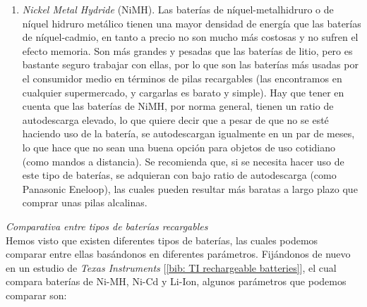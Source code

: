 \documentclass[12pt]{article}
\begin{document}
\begin{enumerate}
		\item \textit{Nickel Metal Hydride} (NiMH). Las baterías de níquel-metalhidruro o de níquel hidruro metálico tienen una mayor densidad de energía que las baterías de níquel-cadmio, en tanto a precio no son mucho más costosas y no sufren el efecto memoria. Son más grandes y pesadas que las baterías de litio, pero es bastante seguro trabajar con ellas, por lo que son las baterías más usadas por el consumidor medio en términos de pilas recargables (las encontramos en cualquier supermercado, y cargarlas es barato y simple). Hay que tener en cuenta que las baterías de NiMH, por norma general, tienen un ratio de autodescarga elevado, lo que quiere decir que a pesar de que no se esté haciendo uso de la batería, se autodescargan igualmente en un par de meses, lo que hace que no sean una buena opción para objetos de uso cotidiano (como mandos a distancia). Se recomienda que, si se necesita hacer uso de este tipo de baterías, se adquieran con bajo ratio de autodescarga (como Panasonic Eneloop), las cuales pueden resultar más baratas a largo plazo que comprar unas pilas alcalinas.
		
	\end{enumerate}
	
	\noindent \textit{Comparativa entre tipos de baterías recargables} \\
	
	\noindent Hemos visto que existen diferentes tipos de baterías, las cuales podemos comparar entre ellas basándonos en diferentes parámetros. Fijándonos de nuevo en un estudio de \textit{Texas Instruments} [\ref{bib: TI rechargeable batteries}], el cual compara baterías de Ni-MH, Ni-Cd y Li-Ion, algunos parámetros que podemos comparar son:
	
\end{document}
